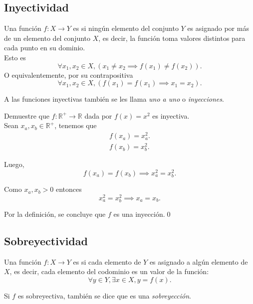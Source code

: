 \documentclass[12pt]{book}
\begin{document}
\subsection{Inyectividad}

\begin{definitionenv}
    Una función $f:X\rightarrow Y$ es  si ningún elemento del conjunto $Y$ es asignado por más de un elemento del conjunto $X$, es decir, la función toma valores distintos para cada punto en su dominio.\\ Esto es
    \[
        \forall x_1,x_2 \in X, (x_1 \neq x_2\implies f(x_1)\neq f(x_2)).
    \]
    O equivalentemente, por su contrapositiva
    \[
        \forall x_1,x_2 \in X, (f(x_1)=f(x_1)\implies x_1=x_2).
    \]
\end{definitionenv}

A las funciones inyectivas también se les llama \textit{uno a uno} o \textit{inyecciones}.\\

\begin{exampleenv}
Demuestre que $f:\mathbb{R}^+\rightarrow\mathbb{R}$ dada por $f(x)=x^2$ es inyectiva.\\

Sean $x_a,x_b\in \mathbb{R}^+$, tenemos que
\begin{align*}
    f(x_a)=x_a^2.\\
    f(x_b)=x_b^2.
\end{align*}

Luego,
\[
    f(x_a)=f(x_b)\implies x_a^2=x_b^2    .
\]

Como $x_a,x_b>0$ entonces
\[
    x_a^2=x_b^2\implies x_a=x_b.
\]

Por la definición, se concluye que $f$ es una inyección.\qed
\end{exampleenv}

\subsection{Sobreyectividad}

\begin{definitionenv}
     Una función $f:X\rightarrow Y$ es  si cada elemento de $Y$ es asignado a algún elemento de $X$, es decir, cada elemento del codominio es un valor de la función:
    \[
        \forall y\in Y, \exists x\in X, y=f(x).
    \]
\end{definitionenv}

Si $f$ es sobreyectiva, también se dice que es una \textit{sobreyección}.\\
\end{document}
